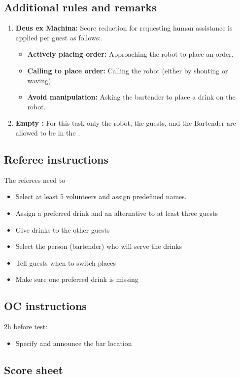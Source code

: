 \subsection*{Additional rules and remarks}
\begin{enumerate}

	\item \textbf{Deus ex Machina:} Score reduction for requesting human assistance is applied per guest as follows:.
	\begin{itemize}[nosep]
		\item \textbf{Actively placing order:} Approaching the robot to place an order.

		\item \textbf{Calling to place order:} Calling the robot (either by shouting or waving).

		\item \textbf{Avoid manipulation:} Asking the bartender to place a drink on the robot.
		
	\end{itemize}

	\item \textbf{Empty \Arena{}:} For this task only the robot, the guests, and the Bartender are allowed to be in the \Arena{}.
\end{enumerate}

\subsection*{Referee instructions}

The referees need to
\begin{itemize}
	\item Select at least 5 volunteers and assign predefined names.
	\item Assign a preferred drink and an alternative to at least three guests
	\item Give drinks to the other guests
	\item Select the person (bartender) who will serve the drinks
	\item Tell guests when to switch places
	\item Make sure one preferred drink is missing
\end{itemize}

\subsection*{OC instructions}

2h before test:
\begin{itemize}
	\item Specify and announce the bar location
\end{itemize}

\subsection*{Score sheet}

